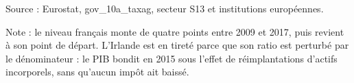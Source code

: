 Source : Eurostat, gov\_10a\_taxag, secteur S13 et institutions européennes.\par Note : le niveau français monte de quatre points entre 2009 et 2017, puis revient à son point de départ. L'Irlande est en tireté parce que son ratio est perturbé par le dénominateur : le PIB bondit en 2015 sous l'effet de réimplantations d'actifs incorporels, sans qu'aucun impôt ait baissé.
